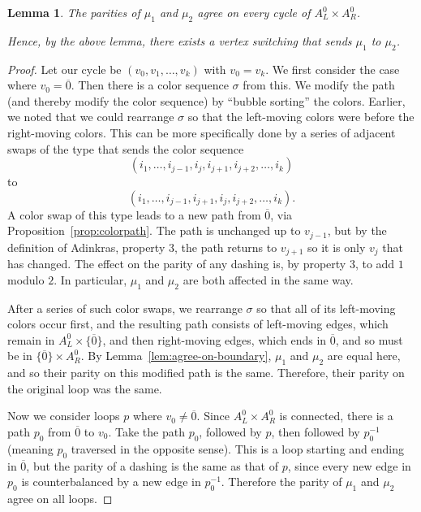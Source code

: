 \documentclass[12pt,twoside,singlespace]{article}
\numberwithin{equation}{section}
\newtheorem{lem}[equation]{Lemma}
\theoremstyle{definition}
\begin{document}
\begin{lem}
\label{lem:switch12}
The parities of $\mu_1$ and $\mu_2$ agree on every cycle of $A_L^0\times A_R^0$.

Hence, by the above lemma, there exists a vertex switching that sends $\mu_1$ to $\mu_2$.
\end{lem}
\begin{proof}
Let our cycle be $(v_0,v_1,\ldots,v_k)$ with $v_0=v_k$. We first consider the case where $v_0=\overline{0}$.  Then there is a color sequence $\sigma$ from this.  We modify the path (and thereby modify the color sequence) by ``bubble sorting'' the colors.  Earlier, we noted that we could rearrange $\sigma$ so that the left-moving colors were before the right-moving colors.  This can be more specifically done by a series of adjacent swaps of the type that sends the color sequence
\[(i_1,\ldots,i_{j-1},i_j,i_{j+1},i_{j+2},\ldots,i_k)\]
to
\[(i_1,\ldots,i_{j-1},i_{j+1},i_j,i_{j+2},\ldots,i_k).\]
A color swap of this type leads to a new path from $\overline{0}$, via Proposition~\ref{prop:colorpath}.  The path is unchanged up to $v_{j-1}$, but by the definition of Adinkras, property 3, the path returns to $v_{j+1}$ so it is only $v_j$ that has changed.  The effect on the parity of any dashing is, by property 3, to add $1$ modulo $2$.  In particular, $\mu_1$ and $\mu_2$ are both affected in the same way.

After a series of such color swaps, we rearrange $\sigma$ so that all of its left-moving colors occur first, and the resulting path consists of left-moving edges, which remain in $A_L^0\times \{\overline{0}\}$, and then right-moving edges, which ends in $\overline{0}$, and so must be in $\{\overline{0}\}\times A_R^0$.  By Lemma~\ref{lem:agree-on-boundary}, $\mu_1$ and $\mu_2$ are equal here, and so their parity on this modified path is the same.  Therefore, their parity on the original loop was the same.

Now we consider loops $p$ where $v_0\not=\overline{0}$.  Since $A_L^0\times A_R^0$ is connected, there is a path $p_0$ from $\overline{0}$ to $v_0$.  Take the path $p_0$, followed by $p$, then followed by $p_0^{-1}$ (meaning $p_0$ traversed in the opposite sense).  This is a loop starting and ending in $\overline{0}$, but the parity of a dashing is the same as that of $p$, since every new edge in $p_0$ is counterbalanced by a new edge in $p_0^{-1}$.  Therefore the parity of $\mu_1$ and $\mu_2$ agree on all loops.
\end{proof}
\end{document}
